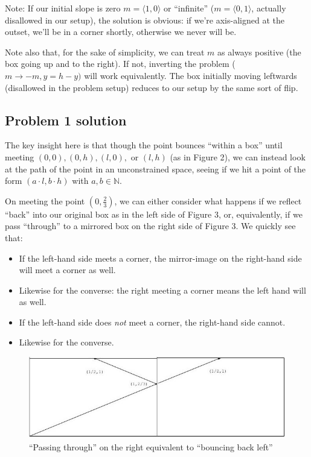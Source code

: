 \documentclass[11pt, oneside]{article} 	%
\begin{document}
Note: If our initial slope is zero $m = \langle 1, 0 \rangle$ or ``infinite'' ($m = \langle 0, 1 \rangle$, actually disallowed in our setup), the solution is obvious: if we're axis-aligned at the outset, we'll be in a corner shortly, otherwise we never will be.

Note also that, for the sake of simplicity, we can treat $m$ as always positive (the box going up and to the right). If not, inverting the problem ($m \rightarrow -m, y = h - y)$ will work equivalently. The box initially moving leftwards (disallowed in the problem setup) reduces to our setup by the same sort of flip.

\subsection{Problem 1 solution}

The key insight here is that though the point bounces ``within a box'' until meeting $(0,0), (0, h), (l, 0), $ or $(l, h)$ (as in Figure 2), we can instead look at the path of the point in an unconstrained space, seeing if we hit a point of the form $(a \cdot l, b \cdot h)$ with $a,b \in \mathbb{N}$.

On meeting the point $(0, \frac{2}{3})$, we can either consider what happens if we reflect ``back'' into our original box as in the left side of Figure 3, or, equivalently, if we pass ``through'' to a mirrored box on the right side of Figure 3. We quickly see that:

\begin{itemize} 
\item If the left-hand side meets a corner, the mirror-image on the right-hand side will meet a corner as well.
\item Likewise for the converse: the right meeting a corner means the left hand will as well.
\item If the left-hand side does \emph{not} meet a corner, the right-hand side cannot.
\item Likewise for the converse.
\end{itemize}

\begin{figure}[!htb]
\centering
\includegraphics[scale=.5]{mirrorright}
 \caption{``Passing through'' on the right equivalent to ``bouncing back left''}
\end{figure}
\end{document}
